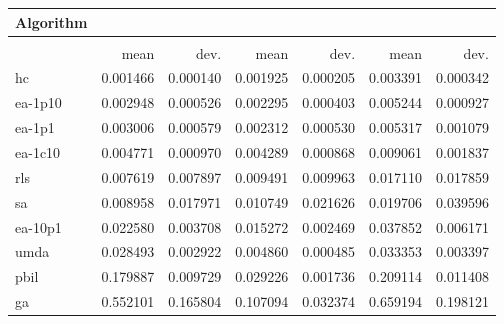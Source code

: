 \begin{tabular}{@{} l *{6}{>{{}}N{1}{2}} @{}}
\toprule
{Algorithm} &  \\
\midrule
&  &  &  \\
\midrule
& {mean} & {dev.} & {mean} & {dev.} & {mean} & {dev.} \\
\midrule
hc & 0.001466 & 0.000140 & 0.001925 & 0.000205 & 0.003391 & 0.000342 \\
ea-1p10 & 0.002948 & 0.000526 & 0.002295 & 0.000403 & 0.005244 & 0.000927 \\
ea-1p1 & 0.003006 & 0.000579 & 0.002312 & 0.000530 & 0.005317 & 0.001079 \\
ea-1c10 & 0.004771 & 0.000970 & 0.004289 & 0.000868 & 0.009061 & 0.001837 \\
rls & 0.007619 & 0.007897 & 0.009491 & 0.009963 & 0.017110 & 0.017859 \\
sa & 0.008958 & 0.017971 & 0.010749 & 0.021626 & 0.019706 & 0.039596 \\
ea-10p1 & 0.022580 & 0.003708 & 0.015272 & 0.002469 & 0.037852 & 0.006171 \\
umda & 0.028493 & 0.002922 & 0.004860 & 0.000485 & 0.033353 & 0.003397 \\
pbil & 0.179887 & 0.009729 & 0.029226 & 0.001736 & 0.209114 & 0.011408 \\
ga & 0.552101 & 0.165804 & 0.107094 & 0.032374 & 0.659194 & 0.198121 \\
\bottomrule
\end{tabular}

